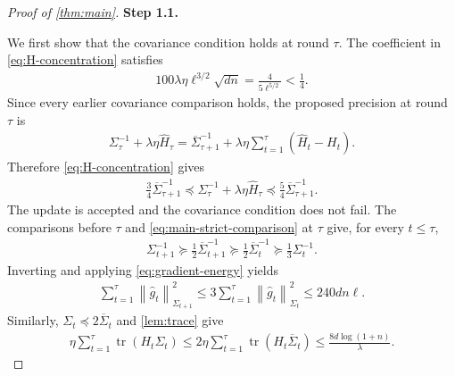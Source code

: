 \documentclass[11pt]{article}
\newcommand{\proofstepinline}[1]{%
    {\sffamily\bfseries\color{blue!55!black}Step #1.}\enspace
}
\newcommand{\tr}{\operatorname{tr}}
\newcommand{\1}{\mathbf 1}
\newcommand{\normm}[2]{\left\lVert #1\right\rVert_{#2}}
\begin{document}
\begin{proof}[Proof of \cref{thm:main}]
    \proofstepinline{1.1}
    We first show that the covariance condition holds at round $\tau$.
    The coefficient in \eqref{eq:H-concentration} satisfies
    \begin{align}
        100\lambda\eta\ell^{3/2}\sqrt{dn}
        =\frac{4}{5\ell^{5/2}}<\frac14.
        \label{eq:main-stability-H-small}
    \end{align}
    Since every earlier covariance comparison holds, the proposed
    precision at round $\tau$ is
    \begin{align}
        \Sigma_\tau^{-1}+\lambda\eta\widehat H_\tau
        =\overline\Sigma_{\tau+1}^{-1}
        +\lambda\eta\sum_{t=1}^\tau(\widehat H_t-H_t).
    \end{align}
    Therefore \eqref{eq:H-concentration} gives
    \begin{align}
        \frac34\overline\Sigma_{\tau+1}^{-1}
        \preceq
        \Sigma_\tau^{-1}+\lambda\eta\widehat H_\tau
        \preceq\frac54\overline\Sigma_{\tau+1}^{-1}.
        \label{eq:main-strict-comparison}
    \end{align}
    The update is accepted and the covariance condition does not fail.
    The comparisons before $\tau$ and \eqref{eq:main-strict-comparison}
    at $\tau$ give, for every $t\leq\tau$,
    \begin{align}
        \Sigma_{t+1}^{-1}
        \succeq\frac12\overline\Sigma_{t+1}^{-1}
        \succeq\frac12\overline\Sigma_t^{-1}
        \succeq\frac13\Sigma_t^{-1}.
    \end{align}
    Inverting and applying \eqref{eq:gradient-energy} yields
    \begin{align}
        \sum_{t=1}^\tau\normm{\widehat g_t}{\Sigma_{t+1}}^2
        \leq3\sum_{t=1}^\tau\normm{\widehat g_t}{\Sigma_t}^2
        \leq240dn\ell.
        \label{eq:main-next-gradient-energy}
    \end{align}
    Similarly, $\Sigma_t\preceq2\overline\Sigma_t$ and
    \cref{lem:trace} give
    \begin{align}
        \eta\sum_{t=1}^\tau\tr(H_t\Sigma_t)
        \leq2\eta\sum_{t=1}^\tau\tr(H_t\overline\Sigma_t)
        \leq\frac{8d\log(1+n)}{\lambda}.
        \label{eq:main-stability-trace}
    \end{align}


\end{proof}
\end{document}
